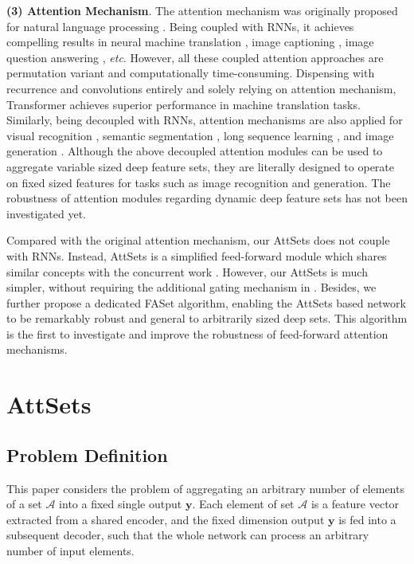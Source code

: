 \documentclass[twocolumn]{svjour3}    \pdfoutput=1
\newcommand{\nickname}{AttSets}
\newcommand{\faset}{FASet}
\newcommand{\etc}{\textit{etc}. }
\begin{document}
\noindent \textbf{(3) Attention Mechanism}. The attention mechanism was originally proposed for natural language processing \citep{Bahdanau2015}. Being coupled with RNNs, it achieves compelling results in neural machine translation \citep{Bahdanau2015}, image captioning \citep{Xu2015b}, image question answering \citep{Yang2016}, \etc However, all these coupled attention approaches are permutation variant and computationally time-consuming. Dispensing with recurrence and convolutions entirely and solely relying on attention mechanism, Transformer \citep{Vaswani2017} achieves superior performance in machine translation tasks. Similarly, being decoupled with RNNs, attention mechanisms are also applied for visual recognition \citep{JieHu2018,Rodriguez2018,Liu2018e,Sarafianos2018,Zhu2018a,Nakka2018,Girdhar2017a}, semantic segmentation \citep{Li2018a}, long sequence learning \citep{Raffel2016}, and image generation \citep{Zhang2018b}. Although the above decoupled attention modules can be used to aggregate variable sized deep feature sets, they are literally designed to operate on fixed sized features for tasks such as image recognition and generation. The robustness of attention modules regarding dynamic deep feature sets has not been investigated yet.

Compared with the original attention mechanism, our \nickname{} does not couple with RNNs. Instead, \nickname{} is a simplified feed-forward module which shares similar concepts with the concurrent work \citep{Ilse2018}. However, our \nickname{} is much simpler, without requiring the additional gating mechanism in \citep{Ilse2018}. Besides, we further propose a dedicated \faset{} algorithm, enabling the \nickname{} based network to be remarkably robust and general to arbitrarily sized deep sets. This algorithm is the first to investigate and improve the robustness of feed-forward attention mechanisms. 
\vspace{-0.25cm}

\section{\nickname{}}
\subsection{Problem Definition}
This paper considers the problem of aggregating an arbitrary number of elements of a set $\mathcal{A}$ into a fixed single output $\boldsymbol{y}$. Each element of set $\mathcal{A}$ is a feature vector extracted from a shared encoder, and the fixed dimension output $\boldsymbol{y}$ is fed into a subsequent decoder, such that the whole network can process an arbitrary number of input elements. 
\end{document}
